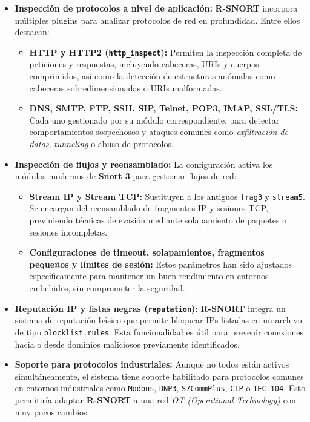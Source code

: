 \documentclass[11pt,a4paper,twoside]{report}
\begin{document}
\begin{itemize}
	\item \textbf{Inspección de protocolos a nivel de aplicación:}  
	\textbf{R-SNORT} incorpora múltiples plugins para analizar protocolos de red en profundidad. Entre ellos destacan:
	\begin{itemize}
		\item \textbf{HTTP y HTTP2 (\texttt{http\_inspect}):} Permiten la inspección completa de peticiones y respuestas, incluyendo cabeceras, URIs y cuerpos comprimidos, así como la detección de estructuras anómalas como cabeceras sobredimensionadas o URIs malformadas.
		\item \textbf{DNS, SMTP, FTP, SSH, SIP, Telnet, POP3, IMAP, SSL/TLS:} Cada uno gestionado por su módulo correspondiente, para detectar comportamientos sospechosos y ataques comunes como \textit{exfiltración de datos}, \textit{tunneling} o abuso de protocolos.
	\end{itemize}
	
	\item \textbf{Inspección de flujos y reensamblado:}  
	La configuración activa los módulos modernos de \textbf{Snort 3} para gestionar flujos de red:
	\begin{itemize}
		\item \textbf{Stream IP y Stream TCP:} Sustituyen a los antiguos \texttt{frag3} y \texttt{stream5}. Se encargan del reensamblado de fragmentos IP y sesiones TCP, previniendo técnicas de evasión mediante solapamiento de paquetes o sesiones incompletas.
		\item \textbf{Configuraciones de timeout, solapamientos, fragmentos pequeños y límites de sesión:} Estos parámetros han sido ajustados específicamente para mantener un buen rendimiento en entornos embebidos, sin comprometer la seguridad.
	\end{itemize}
	
	\item \textbf{Reputación IP y listas negras (\texttt{reputation}):}  
	\textbf{R-SNORT} integra un sistema de reputación básico que permite bloquear IPs listadas en un archivo de tipo \texttt{blocklist.rules}. Esta funcionalidad es útil para prevenir conexiones hacia o desde dominios maliciosos previamente identificados.
	
	\item \textbf{Soporte para protocolos industriales:}  
	Aunque no todos están activos simultáneamente, el sistema tiene soporte habilitado para protocolos comunes en entornos industriales como \texttt{Modbus}, \texttt{DNP3}, \texttt{S7CommPlus}, \texttt{CIP} o \texttt{IEC 104}. Esto permitiría adaptar \textbf{R-SNORT} a una red \textit{OT (Operational Technology)} con muy pocos cambios.
	

\end{itemize}
\end{document}
